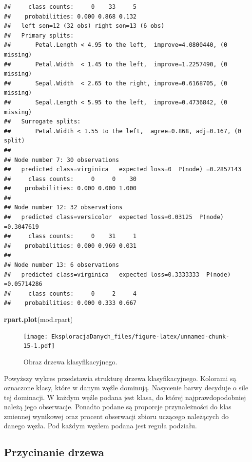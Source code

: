 \documentclass[]{book}
\newenvironment{Shaded}{\begin{snugshade}}{\end{snugshade}}
\newcommand{\KeywordTok}[1]{\textcolor[rgb]{0.13,0.29,0.53}{\textbf{#1}}}
\newcommand{\NormalTok}[1]{#1}
\theoremstyle{plain}
\theoremstyle{definition}
\begin{document}
\begin{verbatim}
##     class counts:     0    33     5
##    probabilities: 0.000 0.868 0.132 
##   left son=12 (32 obs) right son=13 (6 obs)
##   Primary splits:
##       Petal.Length < 4.95 to the left,  improve=4.0800440, (0 missing)
##       Petal.Width  < 1.45 to the left,  improve=1.2257490, (0 missing)
##       Sepal.Width  < 2.65 to the right, improve=0.6168705, (0 missing)
##       Sepal.Length < 5.95 to the left,  improve=0.4736842, (0 missing)
##   Surrogate splits:
##       Petal.Width < 1.55 to the left,  agree=0.868, adj=0.167, (0 split)
## 
## Node number 7: 30 observations
##   predicted class=virginica   expected loss=0  P(node) =0.2857143
##     class counts:     0     0    30
##    probabilities: 0.000 0.000 1.000 
## 
## Node number 12: 32 observations
##   predicted class=versicolor  expected loss=0.03125  P(node) =0.3047619
##     class counts:     0    31     1
##    probabilities: 0.000 0.969 0.031 
## 
## Node number 13: 6 observations
##   predicted class=virginica   expected loss=0.3333333  P(node) =0.05714286
##     class counts:     0     2     4
##    probabilities: 0.000 0.333 0.667
\end{verbatim}

\begin{Shaded}
\begin{Highlighting}[]
\KeywordTok{rpart.plot}\NormalTok{(mod.rpart)}
\end{Highlighting}
\end{Shaded}

\begin{figure}
\centering
\texttt{[image: EksploracjaDanych\_files/figure-latex/unnamed-chunk-15-1.pdf]}
\caption{\label{fig:unnamed-chunk-15}Obraz drzewa klasyfikacyjnego.}
\end{figure}

Powyższy wykres przedstawia strukturę drzewa klasyfikacyjnego. Kolorami są oznaczone klasy, które w danym węźle dominują. Nasycenie barwy decyduje o sile tej dominacji. W każdym węźle podana jest klasa, do której najprawdopodobniej należą jego obserwacje. Ponadto podane są proporcje przynależności do klas zmiennej wynikowej oraz procent obserwacji zbioru uczącego należących do danego węzła. Pod każdym węzłem podana jest reguła podziału.

\hypertarget{przycinanie-drzewa}{%
\subsection{Przycinanie drzewa}\label{przycinanie-drzewa}}
\end{document}
